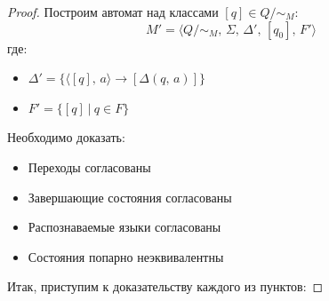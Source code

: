 \documentclass[a4paper,12pt]{article}
\theoremstyle{plain}
\theoremstyle{definition}
\theoremstyle{remark}
\begin{document}
\begin{proof}
	Построим автомат над классами $[q] \in Q / \sim_M$:
	\[M' = \langle Q/\sim_M,\, \Sigma,\, \Delta',\, [q_0],\, F'\rangle\]
	где:
	\begin{itemize}
		\item $\Delta' = \{\langle[q],\, a\rangle \to [\Delta(q,\,a)]\}$
		\item $F' = \{[q] \:|\: q \in F\}$
	\end{itemize}
	Необходимо доказать:
	\begin{itemize}
		\item Переходы согласованы
		\item Завершающие состояния согласованы
		\item Распознаваемые языки согласованы
		\item Состояния попарно неэквивалентны
	\end{itemize}
	Итак, приступим к доказательству каждого из пунктов:


\end{proof}
\end{document}
